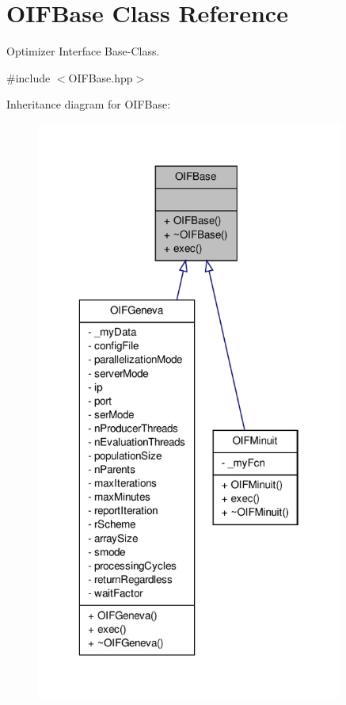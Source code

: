 \hypertarget{classOIFBase}{
\section{OIFBase Class Reference}
\label{d0/d31/classOIFBase}
}


Optimizer Interface Base-\/Class.  




{\ttfamily \#include $<$OIFBase.hpp$>$}



Inheritance diagram for OIFBase:
\nopagebreak
\begin{figure}[H]
\begin{center}
\leavevmode
\includegraphics[width=286pt]{db/d8d/classOIFBase__inherit__graph}
\end{center}
\end{figure}
